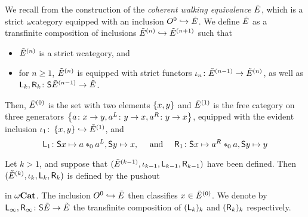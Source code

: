 \begin{dfn} 
    We recall from \cite{hadzihasanovic2024model} the construction of the \emph{coherent walking equivalence \( \tilde E \)}, which is a strict \( \omega \)\nbd category equipped with an inclusion \( O^{0} \hookrightarrow \tilde E \).
    We define \( \tilde E \) as a transfinite composition of inclusions \( \tilde E^{(n)} \hookrightarrow \tilde E^{(n + 1)} \) such that
    \begin{itemize}
        \item \( \tilde E^{(n)} \) is a strict \( n \)\nbd category, and
        \item for \( n \geq 1 \), \( \tilde E^{(n)} \) is equipped with strict functors \( \iota_n \colon \tilde E^{(n - 1)} \to \tilde E^{(n)} \),
    as well as \( \mathsf{L}_k, \mathsf{R}_k \colon \mathsf{S}{\tilde E^{(n - 1)}} \to \tilde E \).
    \end{itemize}
    Then, \( \tilde E^{(0)} \) is the set with two elements \( \left\{ {x, y} \right\} \) and \( \tilde E^{(1)} \) is the free category on three generators \( \left\{ {a \colon x \to y, a^L \colon y \to x, a^R \colon y \to x} \right\} \), equipped with the evident inclusion \( \iota_1 \colon \left\{ {x, y} \right\} \hookrightarrow \tilde E^{(1)} \), and
    \begin{equation*}
        \mathsf{L}_1 \colon \mathsf{S}{x} \mapsto a *_{0} a^L, \mathsf{S}{y} \mapsto x, \quad\text{ and }\quad \mathsf{R}_1 \colon \mathsf{S}{x} \mapsto a^R *_{0} a, \mathsf{S}{y} \mapsto y
    \end{equation*}

    Let \( k > 1 \), and suppose that \( (\tilde E^{(k - 1)}, \iota_{k - 1}, \mathsf{L}_{k - 1}, \mathsf{R}_{k - 1}) \) have been defined.
    Then \( (\tilde E^{(k)}, \iota_{k}, \mathsf{L}_{k}, \mathsf{R}_{k}) \) is defined by the pushout
    \begin{center}
    \end{center}
    in \( {\omega\mathbf{Cat}} \).
    The inclusion \( O^{0} \hookrightarrow \tilde E \) then classifies \( x \in \tilde E^{(0)} \).
    We denote by \( \mathsf{L}_\infty, \mathsf{R}_\infty \colon \mathsf{S}{\tilde E} \to \tilde E \) the transfinite composition of \( (\mathsf{L}_k)_k \) and \( (\mathsf{R}_k)_k \) respectively.
\end{dfn}

